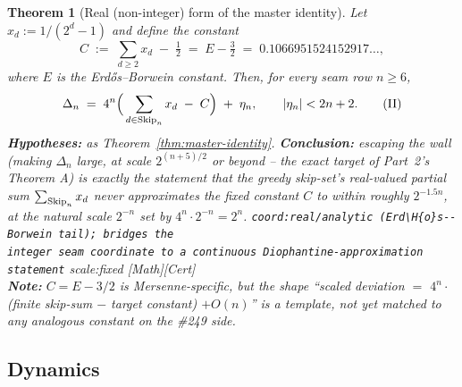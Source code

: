 \documentclass[11pt]{article}
\theoremstyle{plain}
\newtheorem{thm}{Theorem}[section]
\theoremstyle{definition}
\theoremstyle{remark}
\let\origmathrm\mathrm
\renewcommand{\mathrm}[1]{\ifmmode\origmathrm{#1}\else\textrm{#1}\fi}%
\newcommand{\ev}[1]{{\small\textsf{[#1]}}\xspace}
\newcommand{\scale}[1]{{\small\textsf{scale:#1}}\xspace}
\newcommand{\coord}[1]{\texorpdfstring{{\small\nolinkurl{coord:#1}}}{coord:#1}\xspace}
\begin{document}
\begin{thm}[Real (non-integer) form of the master identity]
\label{thm:real-form}
Let $x_d := 1/(2^d-1)$ and define the constant
\[
C \;:=\; \sum_{d \ge 2} x_d \;-\; \tfrac12 \;=\; E - \tfrac32 \;=\; 0.1066951524152917\ldots,
\]
where $E$ is the Erd\H{o}s--Borwein constant. Then, for every seam row $n \ge 6$,
\begin{equation*}
\Delta_n \;=\; 4^n \Big( \sum_{d \in \mathrm{Skip}_n} x_d \;-\; C \Big) \;+\; \eta_n, \qquad
|\eta_n| < 2n+2.
\tag{II}
\end{equation*}
\textbf{Hypotheses:} as Theorem~\ref{thm:master-identity}. \textbf{Conclusion:} escaping the wall
(making $\Delta_n$ large, at scale $2^{(n+5)/2}$ or beyond -- the exact target of Part~2's Theorem A)
is exactly the statement that the greedy skip-set's real-valued partial sum $\sum_{\mathrm{Skip}_n}
x_d$ never approximates the fixed constant $C$ to within roughly $2^{-1.5n}$, at the natural scale
$2^{-n}$ set by $4^n \cdot 2^{-n} = 2^n$. \coord{real/analytic (Erd\H{o}s--Borwein tail); bridges the
integer seam coordinate to a continuous Diophantine-approximation statement} \scale{fixed}
\ev{Math}\ev{Cert}\\
\textbf{Note:} $C = E - 3/2$ is Mersenne-specific, but the shape ``scaled deviation $=$
$4^n \cdot$(finite skip-sum $-$ target constant) $+ O(n)$'' is a template, not yet matched to any
analogous constant on the \#249 side.
\end{thm}

\subsection{Dynamics}
\end{document}
